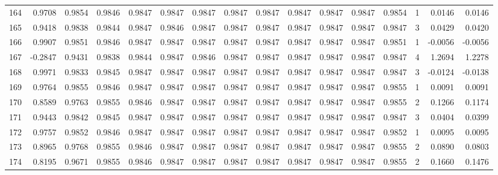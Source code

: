 \begin{tabular}{lrrrrrrrrrrrrrrr}
164 &      0.9708 &  0.9854 &  0.9846 &  0.9847 &  0.9847 &  0.9847 &  0.9847 &  0.9847 &  0.9847 &  0.9847 &   0.9847 &     0.9854 &      1 &                    0.0146 &                     0.0146 \\
165 &      0.9418 &  0.9838 &  0.9844 &  0.9847 &  0.9846 &  0.9847 &  0.9847 &  0.9847 &  0.9847 &  0.9847 &   0.9847 &     0.9847 &      3 &                    0.0429 &                     0.0420 \\
166 &      0.9907 &  0.9851 &  0.9846 &  0.9847 &  0.9847 &  0.9847 &  0.9847 &  0.9847 &  0.9847 &  0.9847 &   0.9847 &     0.9851 &      1 &                   -0.0056 &                    -0.0056 \\
167 &     -0.2847 &  0.9431 &  0.9838 &  0.9844 &  0.9847 &  0.9846 &  0.9847 &  0.9847 &  0.9847 &  0.9847 &   0.9847 &     0.9847 &      4 &                    1.2694 &                     1.2278 \\
168 &      0.9971 &  0.9833 &  0.9845 &  0.9847 &  0.9847 &  0.9847 &  0.9847 &  0.9847 &  0.9847 &  0.9847 &   0.9847 &     0.9847 &      3 &                   -0.0124 &                    -0.0138 \\
169 &      0.9764 &  0.9855 &  0.9846 &  0.9847 &  0.9847 &  0.9847 &  0.9847 &  0.9847 &  0.9847 &  0.9847 &   0.9847 &     0.9855 &      1 &                    0.0091 &                     0.0091 \\
170 &      0.8589 &  0.9763 &  0.9855 &  0.9846 &  0.9847 &  0.9847 &  0.9847 &  0.9847 &  0.9847 &  0.9847 &   0.9847 &     0.9855 &      2 &                    0.1266 &                     0.1174 \\
171 &      0.9443 &  0.9842 &  0.9845 &  0.9847 &  0.9847 &  0.9847 &  0.9847 &  0.9847 &  0.9847 &  0.9847 &   0.9847 &     0.9847 &      3 &                    0.0404 &                     0.0399 \\
172 &      0.9757 &  0.9852 &  0.9846 &  0.9847 &  0.9847 &  0.9847 &  0.9847 &  0.9847 &  0.9847 &  0.9847 &   0.9847 &     0.9852 &      1 &                    0.0095 &                     0.0095 \\
173 &      0.8965 &  0.9768 &  0.9855 &  0.9846 &  0.9847 &  0.9847 &  0.9847 &  0.9847 &  0.9847 &  0.9847 &   0.9847 &     0.9855 &      2 &                    0.0890 &                     0.0803 \\
174 &      0.8195 &  0.9671 &  0.9855 &  0.9846 &  0.9847 &  0.9847 &  0.9847 &  0.9847 &  0.9847 &  0.9847 &   0.9847 &     0.9855 &      2 &                    0.1660 &                     0.1476 \\

\end{tabular}
